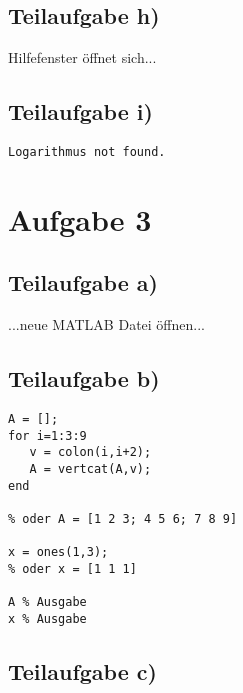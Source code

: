 \documentclass{llncs}
\begin{document}
\subsection*{Teilaufgabe h)}

Hilfefenster \"offnet sich...


\subsection*{Teilaufgabe i)}

\begin{verbatim}
Logarithmus not found.
\end{verbatim}
\newpage

\section*{Aufgabe 3}

\subsection*{Teilaufgabe a)}

...neue MATLAB Datei \"offnen...

\subsection*{Teilaufgabe b)}

\begin{verbatim}
A = [];
for i=1:3:9
   v = colon(i,i+2);
   A = vertcat(A,v); 
end

% oder A = [1 2 3; 4 5 6; 7 8 9]

x = ones(1,3);
% oder x = [1 1 1]

A % Ausgabe
x % Ausgabe
\end{verbatim}

\subsection*{Teilaufgabe c)}
\end{document}
